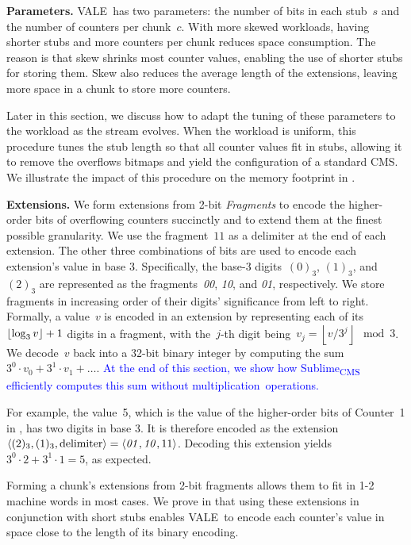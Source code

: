 \documentclass[sigconf]{acmart}
\newcommand{\sketch}{Sublime}
\newcommand{\sketchcms}{\sketch\textsubscript{CMS}\xspace}
\newcommand{\counterencodingabbrv}{VALE}
\begin{document}
\textbf{Parameters.}
\counterencodingabbrv\ has two parameters: the number of bits in each stub~$s$
and the number of counters per chunk~$c$. With more skewed workloads, having
shorter stubs and more counters per chunk reduces space consumption. The reason
is that skew shrinks most counter values, enabling the use of shorter stubs for
storing them. Skew also reduces the average length of the extensions, leaving
more space in a chunk to store more counters.

Later in this section, we discuss how to adapt the tuning of these parameters
to the workload as the stream evolves. When the workload is uniform, this
procedure tunes the stub length so that all counter values fit in stubs,
allowing it to remove the overflows bitmaps and yield the configuration of a
standard CMS. We illustrate the impact of this procedure on the memory
footprint in .

\textbf{Extensions.}
We form extensions from 2{\nobreakdash-}bit \emph{Fragments} to encode the
higher-order bits of overflowing counters succinctly and to extend them at the
finest possible granularity. We use the fragment~$11$ as a delimiter at the end
of each extension. The other three combinations of bits are used to encode each
extension's value in base 3. Specifically, the base{\nobreakdash-}3
digits~$(0)_3$, $(1)_3$, and $(2)_3$ are represented as the
fragments~\textit{00}, \textit{10}, and \textit{01}, respectively. We store
fragments in increasing order of their digits' significance from left to right.
Formally, a value~$v$ is encoded in an extension by representing each of
its~$\left\lfloor \log_3 v \right\rfloor + \nolinebreak 1$ digits in a
fragment, with the~$j${\nobreakdash-}th digit being~\mbox{$v_j=\left\lfloor
v/3^j \right\rfloor \mod 3$}. We decode~$v$ back into a 32-bit binary integer
by computing the sum~$3^0 \cdot v_0 + 3^1 \cdot v_1 + \dots$.
\textcolor{blue}{At the end of this section, we show how \sketchcms efficiently
computes this sum without multiplication~operations.}

For example, the value~5, which is the value of the higher-order bits of
Counter~1 in
,
has two digits in base 3. It is therefore encoded as the extension~$\langle
(2)_3, (1)_3, \text{delimiter} \rangle=\langle \text{\textit{01}},
\text{\textit{10}}, 11 \rangle$. Decoding this extension yields~$3^0 \cdot 2 +
3^1 \cdot 1 = 5$, as expected.

Forming a chunk's extensions from 2-bit fragments allows them to fit in 1-2
machine words in most cases. We prove in  that
using these extensions in conjunction with short stubs enables
\counterencodingabbrv\ to encode each counter's value in space close to the
length of its binary encoding. 
\end{document}
